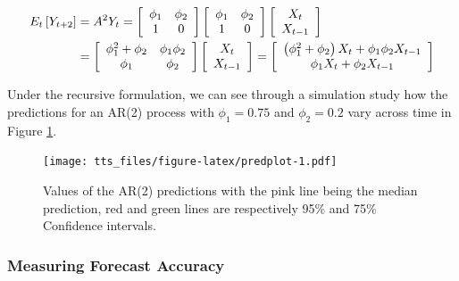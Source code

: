\documentclass[]{book}
\theoremstyle{definition}
\theoremstyle{definition}
\theoremstyle{definition}
\theoremstyle{remark}
\begin{document}
{\[\begin{aligned}
  {E_t}\left[ {{Y_{t + 2}}} \right] &= {A^2}{Y_t} = \left[ {\begin{array}{*{20}{c}}
  {{\phi _1}}&{{\phi _2}} \\ 
  1&0 
\end{array}} \right]\left[ {\begin{array}{*{20}{c}}
  {{\phi _1}}&{{\phi _2}} \\ 
  1&0 
\end{array}} \right]\left[ {\begin{array}{*{20}{c}}
  {{X_t}} \\ 
  {{X_{t - 1}}} 
\end{array}} \right] \hfill \\
   &= \left[ {\begin{array}{*{20}{c}}
  {\phi _1^2 + {\phi _2}}&{{\phi _1}{\phi _2}} \\ 
  {{\phi _1}}&{{\phi _2}} 
\end{array}} \right]\left[ {\begin{array}{*{20}{c}}
  {{X_t}} \\ 
  {{X_{t - 1}}} 
\end{array}} \right] = \left[ {\begin{array}{*{20}{c}}
  {\left( {\phi _1^2 + {\phi _2}} \right){X_t} + {\phi _1}{\phi _2}{X_{t - 1}}} \\ 
  {{\phi _1}{X_t} + {\phi _2}{X_{t - 1}}} 
\end{array}} \right] \hfill \\ 
\end{aligned} \]

Under the recursive formulation, we can see through a simulation study
how the predictions for an AR(2) process with \(\phi _1 = 0.75\) and
\(\phi _2 = 0.2\) vary across time in Figure \ref{fig:predplot}.

\begin{figure}
\centering
\texttt{[image: tts\_files/figure-latex/predplot-1.pdf]}
\caption{\label{fig:predplot}Values of the AR(2) predictions with the pink
line being the median prediction, red and green lines are respectively
95\% and 75\% Confidence intervals.}
\end{figure}

\hypertarget{measuring-forecast-accuracy}{%
\subsubsection{Measuring Forecast
Accuracy}\label{measuring-forecast-accuracy}}

}
\end{document}
